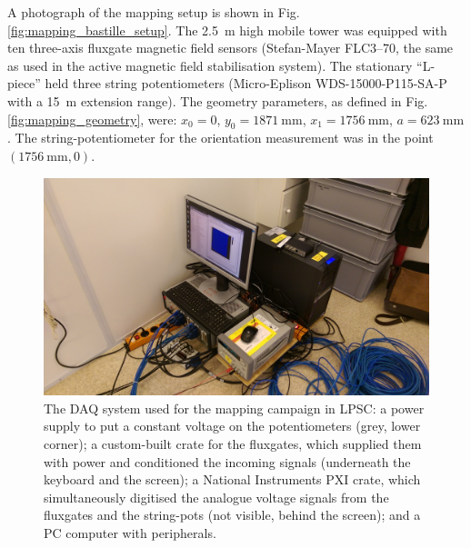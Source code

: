 A photograph of the mapping setup is shown in Fig.\,\ref{fig:mapping_bastille_setup}. The \SI{2.5}{\metre} high mobile tower was equipped with ten three-axis fluxgate magnetic field sensors (Stefan-Mayer FLC3--70, the same as used in the active magnetic field stabilisation system).
The stationary ``L-piece'' held three string potentiometers (Micro-Eplison WDS-15000-P115-SA-P with a \SI{15}{\metre} extension range).
The geometry parameters, as defined in Fig.\,\ref{fig:mapping_geometry}, were: $x_0 = 0$, $y_0 = \SI{1871}{\milli\metre}$, $x_1 = \SI{1756}{\milli\metre}$, $a = \SI{623}{\milli\metre}$. The string-potentiometer for the orientation measurement was in the point $(\SI{1756}{\milli\metre}, 0)$.



\begin{figure}
  \centering
  \includegraphics[width=\linewidth]{gfx/mapping/lpsc/daq.jpeg}
  \caption{The DAQ system used for the mapping campaign in LPSC\@: a power supply to put a constant voltage on the potentiometers (grey, lower corner); a custom-built crate for the fluxgates, which supplied them with power and conditioned the incoming signals (underneath the keyboard and the screen); a National Instruments PXI crate, which simultaneously digitised the analogue voltage signals from the fluxgates and the string-pots (not visible, behind the screen); and a PC computer with peripherals.}\label{fig:mapping_bastille_daq}
\end{figure}

